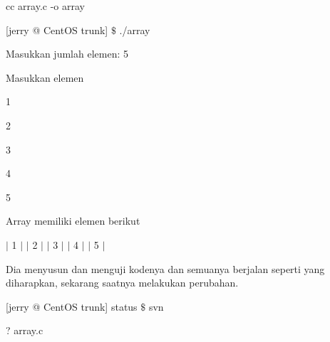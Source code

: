 \noindent 
 \hspace*{0.5in} cc array.c -o array \par
\noindent 
 \hspace*{0.5in} [jerry @ CentOS trunk]  $  \$  $ ./array \par
\noindent 
 \hspace*{0.5in} Masukkan jumlah elemen: 5 \par
\noindent 
 \hspace*{0.5in} Masukkan elemen \par
 \vspace{\baselineskip}
\noindent 
 \hspace*{0.5in}  \hspace*{0.5in} 1 \par
\noindent 
 \hspace*{0.5in}  \hspace*{0.5in} 2 \par
\noindent 
 \hspace*{0.5in}  \hspace*{0.5in} 3 \par
\noindent 
 \hspace*{0.5in}  \hspace*{0.5in} 4 \par
\noindent 
 \hspace*{0.5in}  \hspace*{0.5in} 5 \par
 \vspace{\baselineskip}
\noindent 
 \hspace*{0.5in} Array memiliki elemen berikut \par
\noindent 
 \hspace*{0.5in}  \hspace*{0.5in}  $  \vert  $ 1  $  \vert  $  $  \vert  $ 2  $  \vert  $  $  \vert  $ 3  $  \vert  $  $  \vert  $ 4  $  \vert  $  $  \vert  $ 5  $  \vert  $ \par
\vspace{12pt}
\vspace{\baselineskip}
\noindent 
Dia menyusun dan menguji kodenya dan semuanya berjalan seperti yang diharapkan, sekarang saatnya melakukan perubahan. \par
\vspace{\baselineskip}
\noindent 
 \hspace*{0.5in} [jerry @ CentOS trunk] status  $  \$  $ svn \par
\noindent 
 \hspace*{0.5in} ? array.c \par
